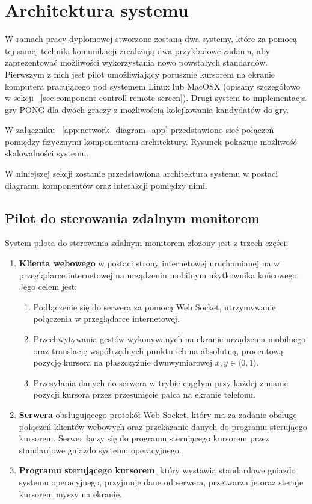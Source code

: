 \newpage
\section{Architektura systemu}

W ramach pracy dyplomowej stworzone zostaną dwa systemy, które za pomocą tej samej techniki komunikacji zrealizują dwa przykładowe zadania, aby zaprezentować możliwości wykorzystania nowo powstałych standardów. Pierwszym z nich jest pilot umożliwiający porusznie kursorem na ekranie komputera pracującego pod systemem Linux lub MacOSX (opisany szczegółowo w sekcji ~\ref{sec:component-controll-remote-screen}). Drugi system to implementacja gry PONG dla dwóch graczy z możliwością kolejkowania kandydatów do gry.


W załączniku ~\ref{app:network_diagram_app} przedstawiono sieć połączeń pomiędzy fizycznymi komponentami architektury. Rysunek pokazuje możliwość skalowalności systemu.


W niniejszej sekcji zostanie przedstawiona architektura systemu w postaci diagramu komponentów oraz interakcji pomiędzy nimi.

\subsection{Pilot do sterowania zdalnym monitorem}

System pilota do sterowania zdalnym monitorem złożony jest z trzech części:

\begin{enumerate}
  \item \textbf{Klienta webowego} w postaci strony internetowej uruchamianej na w przeglądarce internetowej na urządzeniu mobilnym użytkownika końcowego. Jego celem jest:
  \begin{enumerate}
    \item Podłączenie się do serwera za pomocą Web Socket, utrzymywanie połączenia w przeglądarce internetowej.
    \item Przechwytywania gestów wykonywanych na ekranie urządzenia mobilnego oraz translację współrzędnych punktu ich na absolutną, procentową pozycję kursora na płaszczyźnie dwuwymiarowej \( x, y \in \langle0, 1\rangle \).
    \item Przesyłania danych do serwera w trybie ciągłym przy każdej zmianie pozycji kursora przez przesunięcie palca na ekranie telefonu.
  \end{enumerate}
  
 \item \textbf{Serwera} obsługującego protokół Web Socket, który ma za zadanie obsługę połączeń klientów webowych oraz przekazanie danych do programu sterująego kursorem. Serwer łączy się do programu sterującego kursorem przez standardowe gniazdo systemu operacyjnego.
 
 \item \textbf{Programu sterującego kursorem}, który wystawia standardowe gniazdo systemu operacyjnego, przyjmuje dane od serwera, przetwarza je oraz steruje kursorem myszy na ekranie.
\end{enumerate}

